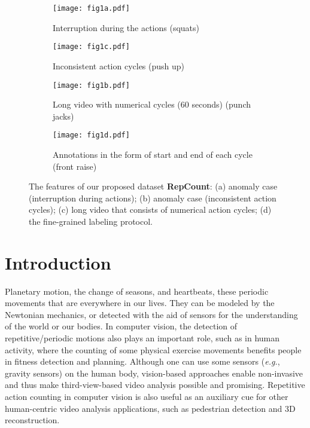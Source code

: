 \documentclass[10pt,twocolumn,letterpaper]{article}
\begin{document}
\begin{figure*}[ht!]
  \centering
    \begin{subfigure}{0.48\textwidth}
      \centering   
      \texttt{[image: fig1a.pdf]}
        \caption{Interruption during the actions (squats)}
        \label{fig:1a}
    \end{subfigure}        
    \hfill  \begin{subfigure}{0.48\textwidth}
      \centering   
      \texttt{[image: fig1c.pdf]}
        \caption{Inconsistent action cycles (push up)}
        \label{fig:1b}
    \end{subfigure}
    \hfill
    \begin{subfigure}{0.48\textwidth}
      \centering   
      \texttt{[image: fig1b.pdf]}
        \caption{Long video with numerical cycles (60 seconds) (punch jacks)}
        \label{fig:1c}
    \end{subfigure}
    \hfill
    \begin{subfigure}{0.48\textwidth}
      \centering   
      \texttt{[image: fig1d.pdf]}
        \caption{Annotations in the form of start and end of each cycle (front raise)}
        \label{fig:1d}
    \end{subfigure}
    
\caption{
The features of our proposed dataset \textbf{RepCount}: (a) anomaly case (interruption during actions); (b) anomaly case (inconsistent action cycles); (c) long video that consists of numerical action cycles; (d) the fine-grained labeling protocol. 
}
\label{fig:teaser}
\end{figure*}




\section{Introduction}\label{sec:intro}



Planetary motion, the change of seasons, and heartbeats, these periodic movements that are everywhere in our lives. They can be modeled by the Newtonian mechanics, or detected with the aid of sensors for the understanding of the world or our bodies. In computer vision, the detection of repetitive/periodic motions also plays an important role, such as in human activity, where the counting of some physical exercise movements benefits people in fitness detection and planning. Although one can use some sensors (\emph{e.g.}, gravity sensors) on the human body, vision-based approaches enable non-invasive and thus make third-view-based video analysis possible and promising. Repetitive action counting in computer vision is also useful as an auxiliary cue for other human-centric video analysis applications, such as pedestrian detection\cite{Pedestrian} and 3D reconstruction\cite{Li_2018_CVPR, Ribnick_3dreconstruction}.
\end{document}
